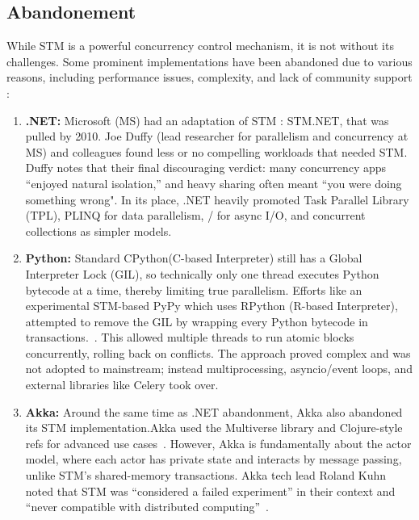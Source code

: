 \subsection{Abandonement}

While STM is a powerful concurrency control mechanism, it is not without its challenges. Some prominent implementations have been abandoned due to various reasons, including performance issues, complexity, and lack of community support :
\begin{enumerate}
    \item \textbf{.NET:}  Microsoft (MS) had an adaptation of STM :  STM.NET, that was pulled by 2010. Joe Duffy (lead researcher for parallelism and concurrency at MS) and colleagues found less or no compelling workloads that needed STM. Duffy notes that their final discouraging verdict: many concurrency apps “enjoyed natural isolation,” and heavy sharing often meant “you were doing something wrong"\cite{infoq.com}.  In its place, .NET heavily promoted Task Parallel Library (TPL), PLINQ for data parallelism, / for async I/O, and concurrent collections as simpler models.
    \item \textbf{Python:}  Standard CPython(C-based Interpreter) still has a Global Interpreter Lock (GIL), so technically only one thread executes Python bytecode at a time, thereby limiting true parallelism. Efforts like an experimental STM-based PyPy which uses RPython (R-based Interpreter), attempted to remove the GIL by wrapping every Python bytecode in transactions.~\cite{pypy.org}. This allowed multiple threads to run atomic blocks concurrently, rolling back on conflicts. The approach proved complex and was not adopted to mainstream; instead multiprocessing, asyncio/event loops, and external libraries like Celery took over.
    \item \textbf{Akka:} Around the same time as .NET abandonment, Akka also abandoned its STM implementation.Akka used the Multiverse library and Clojure-style refs for advanced use cases~\cite{docs.akka.io}. 
    However, Akka is fundamentally about the actor model, where each actor has private state and interacts by message passing, unlike STM’s shared-memory transactions. Akka tech lead Roland Kuhn noted that STM was “considered a failed experiment” in their context and “never compatible with distributed computing”~\cite{groups.google.com}.
\end{enumerate}
